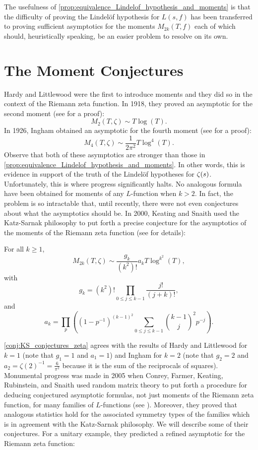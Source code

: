   The usefulness of \cref{prop:equivalence_Lindelof_hypothesis_and_moments} is that the difficulty of proving the Lindel\"of hypothesis for $L(s,f)$ has been transferred to proving sufficient asymptotics for the moments $M_{2k}(T,f)$ each of which should, heuristically speaking, be an easier problem to resolve on its own.
\section{The Moment Conjectures}
  Hardy and Littlewood were the first to introduce moments and they did so in the context of the Riemann zeta function. In 1918, they proved an asymptotic for the second moment (see \cite{hardy1916contributions} for a proof):
  \[
    M_{2}(T,\zeta) \sim T\log(T).
  \]
  In 1926, Ingham obtained an asymptotic for the fourth moment (see \cite{ingham1928mean} for a proof):
  \[
    M_{4}(T,\zeta) \sim \frac{1}{2\pi^{2}}T\log^{4}(T).
  \]
  Observe that both of these asymptotics are stronger than those in \cref{prop:equivalence_Lindelof_hypothesis_and_moments}. In other words, this is evidence in support of the truth of the Lindel\"of hypotheses for $\zeta(s)$. Unfortunately, this is where progress significantly halts. No analogous formula have been obtained for moments of any $L$-function when $k > 2$. In fact, the problem is so intractable that, until recently, there were not even conjectures about what the asymptotics should be. In 2000, Keating and Snaith used the Katz-Sarnak philosophy to put forth a precise conjecture for the asymptotics of the moments of the Riemann zeta function (see \cite{keating2000random} for details):

  \begin{conjecture}\label{conj:KS_conjectures_zeta}
    For all $k \ge 1$,
    \[
      M_{2k}(T,\zeta) \sim \frac{g_{k}}{(k^{2})!}a_{k}T\log^{k^{2}}(T),
    \]
    with
    \[
      g_{k} = (k^{2})!\prod_{0 \le j \le k-1}\frac{j!}{(j+k)!},
    \]
    and
    \[
      a_{k} = \prod_{p}\left((1-p^{-1})^{(k-1)^{2}}\sum_{0 \le j \le k-1}\binom{k-1}{j}^{2}p^{-j}\right).
    \]
  \end{conjecture}
  
  \cref{conj:KS_conjectures_zeta} agrees with the results of Hardy and Littlewood for $k = 1$ (note that $g_{1} = 1$ and $a_{1} = 1$) and Ingham for $k = 2$ (note that $g_{2} = 2$ and $a_{2} = \zeta(2)^{-1} = \frac{6}{\pi^{2}}$ because it is the sum of the reciprocals of squares). Monumental progress was made in 2005 when Conrey, Farmer, Keating, Rubinstein, and Snaith used random matrix theory to put forth a procedure for deducing conjectured asymptotic formulas, not just moments of the Riemann zeta function, for many families of $L$-functions (see \cite{conrey2005integral}). Moreover, they proved that analogous statistics hold for the associated symmetry types of the families which is in agreement with the Katz-Sarnak philosophy. We will describe some of their conjectures. For a unitary example, they predicted a refined asymptotic for the Riemann zeta function:

